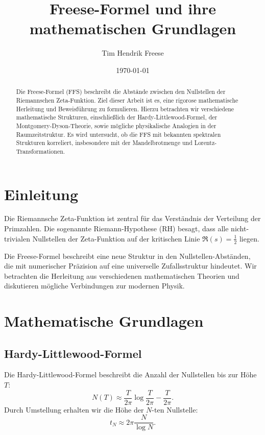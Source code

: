\documentclass[a4paper,12pt]{article}
\title{Freese-Formel und ihre mathematischen Grundlagen}
\author{Tim Hendrik Freese}
\date{\today}
\begin{document}
\maketitle

\begin{abstract}
Die Freese-Formel (FFS) beschreibt die Abstände zwischen den Nullstellen der Riemannschen Zeta-Funktion. Ziel dieser Arbeit ist es, eine rigorose mathematische Herleitung und Beweisführung zu formulieren. Hierzu betrachten wir verschiedene mathematische Strukturen, einschließlich der Hardy-Littlewood-Formel, der Montgomery-Dyson-Theorie, sowie mögliche physikalische Analogien in der Raumzeitstruktur. Es wird untersucht, ob die FFS mit bekannten spektralen Strukturen korreliert, insbesondere mit der Mandelbrotmenge und Lorentz-Transformationen.
\end{abstract}

\tableofcontents

\section{Einleitung}
Die Riemannsche Zeta-Funktion ist zentral für das Verständnis der Verteilung der Primzahlen. Die sogenannte Riemann-Hypothese (RH) besagt, dass alle nicht-trivialen Nullstellen der Zeta-Funktion auf der kritischen Linie $\Re(s) = \frac{1}{2}$ liegen. 

Die Freese-Formel beschreibt eine neue Struktur in den Nullstellen-Abständen, die mit numerischer Präzision auf eine universelle Zufallsstruktur hindeutet. Wir betrachten die Herleitung aus verschiedenen mathematischen Theorien und diskutieren mögliche Verbindungen zur modernen Physik.

\section{Mathematische Grundlagen}

\subsection{Hardy-Littlewood-Formel}
Die Hardy-Littlewood-Formel beschreibt die Anzahl der Nullstellen bis zur Höhe $T$:
\begin{equation}
N(T) \approx \frac{T}{2\pi} \log \frac{T}{2\pi} - \frac{T}{2\pi}.
\end{equation}
Durch Umstellung erhalten wir die Höhe der $N$-ten Nullstelle:
\begin{equation}
t_N \approx 2\pi \frac{N}{\log N}.
\end{equation}
\end{document}
